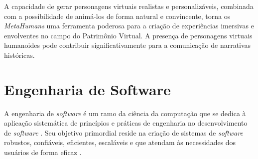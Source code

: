 {A capacidade de gerar personagens virtuais realistas e personalizáveis, combinada com a possibilidade de animá-los de forma natural e convincente, torna os \textit{MetaHumans} uma ferramenta poderosa para a criação de experiências imersivas e envolventes no campo do Patrimônio Virtual. A presença de personagens virtuais humanoides pode contribuir significativamente para a comunicação de narrativas históricas.

\section{Engenharia de Software}
A engenharia de \textit{software} é um ramo da ciência da computação que se dedica à aplicação sistemática de princípios e práticas de engenharia no desenvolvimento de \textit{software} \citep{pressman2021engenharia}. Seu objetivo primordial reside na criação de sistemas de \textit{software} robustos, confiáveis, eficientes, escaláveis e que atendam às necessidades dos usuários de forma eficaz \citep{Sommerville2011}.



}

